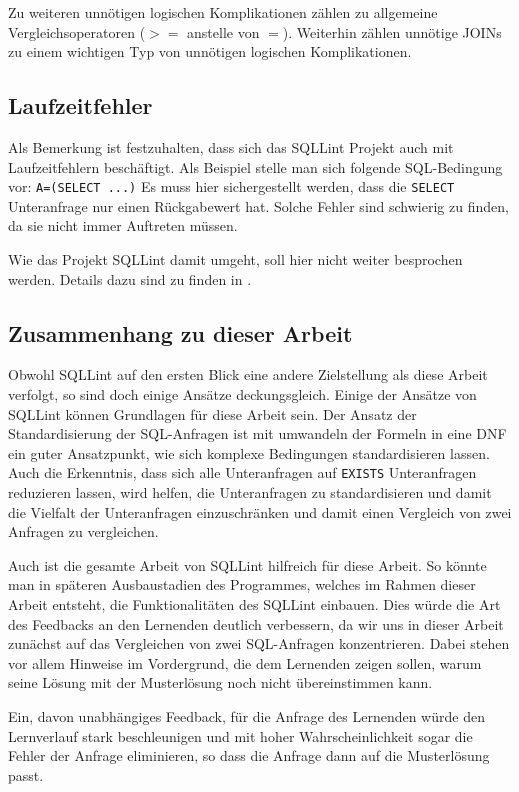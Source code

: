 Zu weiteren unnötigen logischen Komplikationen zählen zu allgemeine Vergleichsoperatoren ($>=$ anstelle von $=$). Weiterhin zählen unnötige JOINs zu einem wichtigen Typ von unnötigen logischen Komplikationen.

\subsection{Laufzeitfehler}

Als Bemerkung ist festzuhalten, dass sich das SQLLint Projekt auch mit Laufzeitfehlern beschäftigt. Als Beispiel stelle man sich folgende SQL-Bedingung vor: \verb|A=(SELECT ...)| Es muss hier sichergestellt werden, dass die \verb|SELECT| Unteranfrage nur einen Rückgabewert hat. Solche Fehler sind schwierig zu finden, da sie nicht immer Auftreten müssen. 

Wie das Projekt SQLLint damit umgeht, soll hier nicht weiter besprochen werden. Details dazu sind zu finden in \cite{brass2}. 

\subsection*{Zusammenhang zu dieser Arbeit}

Obwohl SQLLint auf den ersten Blick eine andere Zielstellung als diese Arbeit verfolgt, so sind doch einige Ansätze deckungsgleich. Einige der Ansätze von SQLLint können Grundlagen für diese Arbeit sein. Der Ansatz der Standardisierung der SQL-Anfragen ist mit umwandeln der Formeln in eine DNF ein guter Ansatzpunkt, wie sich komplexe Bedingungen standardisieren lassen. Auch die Erkenntnis, dass sich alle Unteranfragen auf \verb|EXISTS| Unteranfragen reduzieren lassen, wird helfen, die Unteranfragen zu standardisieren und damit die Vielfalt der Unteranfragen einzuschränken und damit einen Vergleich von zwei Anfragen zu vergleichen.

Auch ist die gesamte Arbeit von SQLLint hilfreich für diese Arbeit. So könnte man in späteren Ausbaustadien des Programmes, welches im Rahmen dieser Arbeit entsteht, die Funktionalitäten des SQLLint einbauen. Dies würde die Art des Feedbacks an den Lernenden deutlich verbessern, da wir uns in dieser Arbeit zunächst auf das Vergleichen von zwei SQL-Anfragen konzentrieren. Dabei stehen vor allem Hinweise im Vordergrund, die dem Lernenden zeigen sollen, warum seine Lösung mit der Musterlösung noch nicht übereinstimmen kann.

Ein, davon unabhängiges Feedback, für die Anfrage des Lernenden würde den Lernverlauf stark beschleunigen und mit hoher Wahrscheinlichkeit sogar die Fehler der Anfrage eliminieren, so dass die Anfrage dann auf die Musterlösung passt.